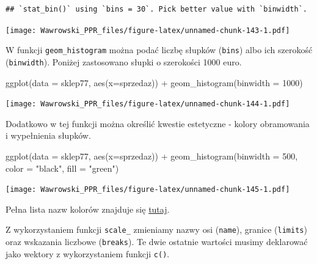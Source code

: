 \documentclass[
]{book}
\newenvironment{Shaded}{\begin{snugshade}}{\end{snugshade}}
\newcommand{\AttributeTok}[1]{\textcolor[rgb]{0.77,0.63,0.00}{#1}}
\newcommand{\DecValTok}[1]{\textcolor[rgb]{0.00,0.00,0.81}{#1}}
\newcommand{\FunctionTok}[1]{\textcolor[rgb]{0.00,0.00,0.00}{#1}}
\newcommand{\NormalTok}[1]{#1}
\newcommand{\SpecialCharTok}[1]{\textcolor[rgb]{0.00,0.00,0.00}{#1}}
\newcommand{\StringTok}[1]{\textcolor[rgb]{0.31,0.60,0.02}{#1}}
\begin{document}
\begin{verbatim}
## `stat_bin()` using `bins = 30`. Pick better value with `binwidth`.
\end{verbatim}

\texttt{[image: Wawrowski\_PPR\_files/figure-latex/unnamed-chunk-143-1.pdf]}

W funkcji \texttt{geom\_histogram} można podać liczbę słupków (\texttt{bins}) albo ich szerokość (\texttt{binwidth}). Poniżej zastosowano słupki o szerokości 1000 euro.

\begin{Shaded}
\begin{Highlighting}[]
\FunctionTok{ggplot}\NormalTok{(}\AttributeTok{data =}\NormalTok{ sklep77, }\FunctionTok{aes}\NormalTok{(}\AttributeTok{x=}\NormalTok{sprzedaz)) }\SpecialCharTok{+}
  \FunctionTok{geom\_histogram}\NormalTok{(}\AttributeTok{binwidth =} \DecValTok{1000}\NormalTok{)}
\end{Highlighting}
\end{Shaded}

\texttt{[image: Wawrowski\_PPR\_files/figure-latex/unnamed-chunk-144-1.pdf]}

Dodatkowo w tej funkcji można określić kwestie estetyczne - kolory obramowania i wypełnienia słupków.

\begin{Shaded}
\begin{Highlighting}[]
\FunctionTok{ggplot}\NormalTok{(}\AttributeTok{data =}\NormalTok{ sklep77, }\FunctionTok{aes}\NormalTok{(}\AttributeTok{x=}\NormalTok{sprzedaz)) }\SpecialCharTok{+}
  \FunctionTok{geom\_histogram}\NormalTok{(}\AttributeTok{binwidth =} \DecValTok{500}\NormalTok{, }\AttributeTok{color =} \StringTok{"black"}\NormalTok{, }\AttributeTok{fill =} \StringTok{"green"}\NormalTok{)}
\end{Highlighting}
\end{Shaded}

\texttt{[image: Wawrowski\_PPR\_files/figure-latex/unnamed-chunk-145-1.pdf]}

Pełna lista nazw kolorów znajduje się \href{http://www.stat.columbia.edu/~tzheng/files/Rcolor.pdf}{tutaj}.

Z wykorzystaniem funkcji \texttt{scale\_} zmieniamy nazwy osi (\texttt{name}), granice (\texttt{limits}) oraz wskazania liczbowe (\texttt{breaks}). Te dwie ostatnie wartości musimy deklarować jako wektory z wykorzystaniem funkcji \texttt{c()}.
\end{document}
